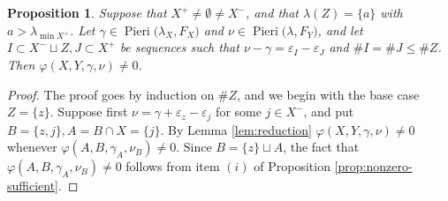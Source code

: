 \documentclass[11pt,fleqn]{amsart}
\renewcommand\phi{\varphi}
\renewcommand\epsilon{\varepsilon}
\newtheorem{prop}[thm]{Proposition}
\theoremstyle{definition}
\theoremstyle{remark}
\theoremstyle{remark}
\newcommand\Pieri[2]{\operatorname{Pieri}{(#1},{#2)}}
\newcommand\map[4]{\phi(#3,#4,#1,#2)}
\begin{document}
\begin{prop}
\label{prop:gg-sufficient}
Suppose that $X^+ \neq \emptyset \neq X^-$, and that $\lambda(Z) = \{a\}$ with 
$a > \lambda_{\min X^+}$. 
Let $\gamma \in \Pieri{\lambda_X}{F_X}$ and $\nu \in \Pieri{\lambda}{F_Y}$, and
let $I\subset X^- \sqcup Z, J \subset X^+$ be sequences such that $\nu - 
\gamma = \epsilon_I - \epsilon_J$ and $\#I = \#J \leq \#Z$. Then 
$\map{\gamma}{\nu}{X}{Y} \neq 0$.
\end{prop}
\begin{proof}
The proof goes by induction on $\#Z$, and we begin with the base case $Z = 
\{z\}$. Suppose first $\nu = \gamma + \epsilon_z - \epsilon_j$ for some $j \in 
X^-$, and put $B = \{z,j\}, A = B \cap X = \{j\}$. By Lemma \ref{lem:reduction} 
$\map{\gamma}{\nu}{X}{Y} \neq 0$ whenever $\map{\gamma_A}{\nu_B}{A}{B} \neq 0$. 
Since $B = \{z\} \sqcup A$, the fact that 
$\map{\gamma_A}{\nu_B}{A}{B} \neq 0$ follows from item $(i)$ of 
Proposition \ref{prop:nonzero-sufficient}.


\end{proof}
\end{document}
